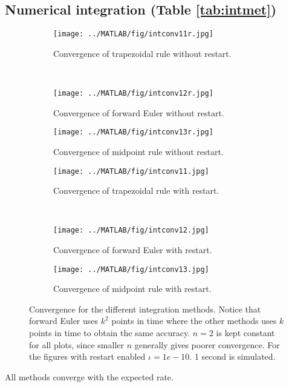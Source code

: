 \subsection{Numerical integration (Table \ref{tab:intmet})}%
\begin{figure}[H]
        \centering
        \begin{subfigure}[b]{0.30\textwidth}
                \texttt{[image: ../MATLAB/fig/intconv11r.jpg]}
                \caption{ Convergence of trapezoidal rule without restart. }
                \label{fig:intconv11r}
        \end{subfigure}
        ~
        \begin{subfigure}[b]{0.30\textwidth}
                \texttt{[image: ../MATLAB/fig/intconv12r.jpg]}
                \caption{ Convergence of forward Euler without restart. }
                \label{fig:intconv12r}
        \end{subfigure}
        \begin{subfigure}[b]{0.30\textwidth}
                \texttt{[image: ../MATLAB/fig/intconv13r.jpg]}
                \caption{ Convergence of midpoint rule without restart. }
                \label{fig:intconv13r}
        \end{subfigure}         
        
        \begin{subfigure}[b]{0.30\textwidth}
                \texttt{[image: ../MATLAB/fig/intconv11.jpg]}
                \caption{ Convergence of trapezoidal rule with restart. }
                \label{fig:intconv11}
        \end{subfigure}
        ~
        \begin{subfigure}[b]{0.30\textwidth}
                \texttt{[image: ../MATLAB/fig/intconv12.jpg]}
                \caption{ Convergence of forward Euler with restart. }
                \label{fig:intconv12}
        \end{subfigure}
        \begin{subfigure}[b]{0.30\textwidth}
                \texttt{[image: ../MATLAB/fig/intconv13.jpg]}
                \caption{ Convergence of midpoint rule with restart. }
                \label{fig:intconv13}
        \end{subfigure}
        
 
\caption{ Convergence for the different integration methods. Notice that forward Euler uses $k^2$ points in time where the other methods uses $k$ points in time to obtain the same accuracy. $n=2$ is kept constant for all plots, since smaller $n$ generally gives poorer convergence. For the figures with restart enabled $\iota = 1e-10$. 1 second is simulated. }
\label{fig:intconv}
\end{figure}
\noindent All methods converge with the expected rate. \\

